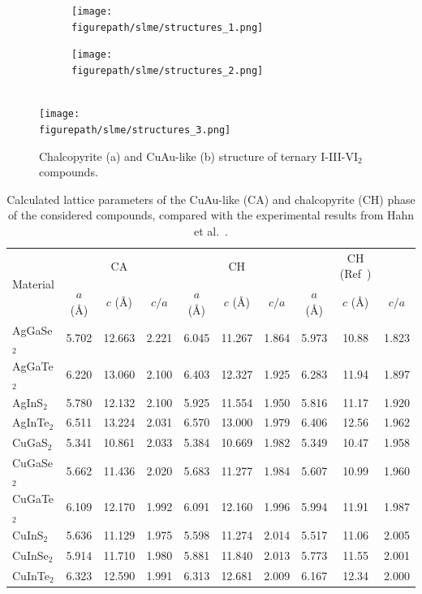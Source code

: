 \begin{refsection}
\begin{figure}[ht]  
\setlength{\captionmargin}{10pt} 
\centering 
\begin{subfigure}{0.24\textwidth} 
\centering 
\texttt{[image: \\figurepath/slme/structures\_1.png]} 
\caption{} 
\end{subfigure}%
\begin{subfigure}{0.24\textwidth} 
\centering 
\texttt{[image: \\figurepath/slme/structures\_2.png]} 
\caption{} 
\end{subfigure} 
\vspace{0.7em}\\ 
\texttt{[image: \\figurepath/slme/structures\_3.png]} 
\caption{\label{slme:fig-CuAu_structure} Chalcopyrite (a) and CuAu-like (b) 
structure of ternary \mbox{I-III-VI$_2$} compounds.} 
\end{figure} 
 
\begin{table}[ht] 
\centering 
\renewcommand{\arraystretch}{1.2} 
\caption{Calculated lattice parameters of the \mbox{CuAu-like} (CA) and chalcopyrite (\gls{CH}) 
phase of the considered compounds, compared with the experimental results from Hahn et al.~\cite{Hahn1953}.} 
\label{slme:tab-lattice} 
\begin{tabular*}{\textwidth}{@{\extracolsep{\fill}}lccccccccc}\hline 
\multirow{2}{*}{Material}    & & \gls{CA} & & & \gls{CH} & & & \gls{CH} (Ref~\cite{Hahn1953}) & 
\\ \cmidrule(lr){2-4} \cmidrule(lr){5-7} \cmidrule(lr){8-10} 
 			&  $a$ (\si{\angstrom}) & $c$ (\si{\angstrom}) & $c/a$ & $a$ 
(\si{\angstrom}) & $c$ (\si{\angstrom}) & $c/a$ & $a$ (\si{\angstrom}) & $c$ 
(\si{\angstrom}) & $c/a$ \\\hline 
AgGaSe$_2$ 	& 5.702 & 12.663 & 2.221 & 6.045 & 11.267 & 1.864 & 5.973 & 10.88 
& 1.823 \\ 
AgGaTe$_2$ 	& 6.220 & 13.060 & 2.100 & 6.403 & 12.327 & 1.925 & 6.283 & 11.94 
& 1.897 \\ 
AgInS$_2$  	& 5.780 & 12.132 & 2.100 & 5.925 & 11.554 & 1.950 & 5.816 & 11.17 
& 1.920 \\ 
AgInTe$_2$ 	& 6.511 & 13.224 & 2.031 & 6.570 & 13.000 & 1.979 & 6.406 & 12.56 
& 1.962 \\ 
CuGaS$_2$  	& 5.341 & 10.861 & 2.033 & 5.384 & 10.669 & 1.982 & 5.349 & 10.47 
& 1.958 \\ 
CuGaSe$_2$ 	& 5.662 & 11.436 & 2.020 & 5.683 & 11.277 & 1.984 & 5.607 & 10.99 
& 1.960 \\ 
CuGaTe$_2$ 	& 6.109 & 12.170 & 1.992 & 6.091 & 12.160 & 1.996 & 5.994 & 11.91 
& 1.987 \\ 
CuInS$_2$ 	& 5.636 & 11.129 & 1.975 & 5.598 & 11.274 & 2.014 & 5.517 & 11.06 & 
2.005 \\ 
CuInSe$_2$ 	& 5.914 & 11.710 & 1.980 & 5.881 & 11.840 & 2.013 & 5.773 & 11.55 
& 2.001 \\ 
CuInTe$_2$ 	& 6.323 & 12.590 & 1.991 & 6.313 & 12.681 & 2.009 & 6.167 & 12.34 
& 2.000 \\ \hline 
\end{tabular*} 
\end{table} 


\end{refsection}
